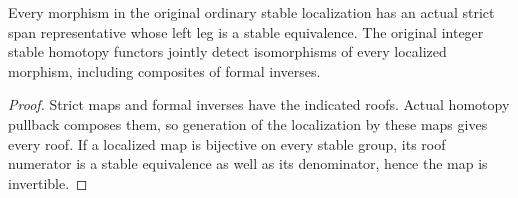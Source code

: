 \begin{proposition}
  \label{prop:actual-source-roofs-and-conservativity}
  \leanok
  Every morphism in the original ordinary stable localization has an actual strict span representative whose left leg is a stable equivalence. The original integer stable homotopy functors jointly detect isomorphisms of every localized morphism, including composites of formal inverses.
\end{proposition}
\begin{proof}
  Strict maps and formal inverses have the indicated roofs. Actual homotopy pullback composes them, so generation of the localization by these maps gives every roof. If a localized map is bijective on every stable group, its roof numerator is a stable equivalence as well as its denominator, hence the map is invertible.
  \leanok
\end{proof}



